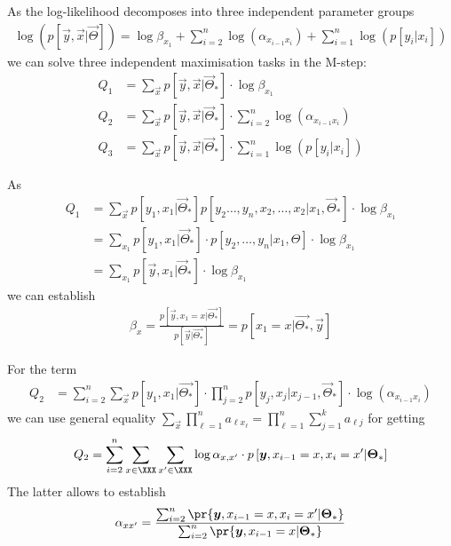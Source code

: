 \documentclass[landscape,footrule]{foils}
\newcommand{\pd}[1]{p\left[#1\right]}
\begin{document}
\enlargethispage{1cm}
As the log-likelihood decomposes into three independent parameter groups 
\begin{align*}
\log\left(\pd{\vec{y},\vec{x}|\vec{\Theta}}\right)=\log \beta_{x_1}+\sum_{i=2}^n\log(\alpha_{x_{i-1}x_i})+\sum_{i=1}^n\log(\pd{y_i|x_i})
\end{align*}
we can solve three independent maximisation tasks in the M-step:
\begin{align*}
Q_1&=\sum_{\vec{x}}\pd{\vec{y},\vec{x}|\vec{\Theta}_*}\cdot \log \beta_{x_1}\\
Q_2&=\sum_{\vec{x}}\pd{\vec{y},\vec{x}|\vec{\Theta}_*}\cdot \sum_{i=2}^n\log(\alpha_{x_{i-1}x_i})\\
Q_3&=\sum_{\vec{x}}\pd{\vec{y},\vec{x}|\vec{\Theta}_*}\cdot \sum_{i=1}^n\log(\pd{y_i|x_i})
\end{align*} 

As
\begin{align*}
Q_1&=\sum_{\vec{x}}\pd{y_1,x_1|\vec{\Theta}_*}\pd{y_2\ldots,y_n,x_2,\ldots,x_2|x_1,\vec{\Theta}_*}\cdot \log \beta_{x_1}\\
&=\sum_{x_1}\pd{y_1,x_1|\vec{\Theta}_*}\cdot \pd{y_2,\ldots,y_n|x_1,\Theta} \cdot \log \beta_{x_1}\\
&=\sum_{x_1}\pd{\vec{y},x_1|\vec{\Theta}_*} \cdot \log \beta_{x_1}
\end{align*}
we can establish
\begin{align*}
\beta_x=\frac{\pd{\vec{y},x_1=x|\vec{\Theta_*}}}{\pd{\vec{y}|\vec{\Theta_*}}}=\pd{x_1=x|\vec{\Theta_*},\vec{y}}
\end{align*}

For the term 
\begin{align*}
Q_2&=\sum_{i=2}^n\sum_{\vec{x}}\pd{y_1,x_1|\vec{\Theta_*}}\cdot\prod_{j=2}^n\pd{y_j,x_j|x_{j-1},\vec{\Theta}_*}\cdot \log(\alpha_{x_{i-1}x_i})
\end{align*}
we can use general equality
$\sum_{\vec{x}}\prod_{\ell=1}^n 
a_{\ell x_\ell}=\prod_{\ell=1}^n\sum_{j=1}^k a_{\ell j}$
for getting
\begin{align*}
Q_2=\sum_{i=2}^n\sum_{x\in\XXX}\sum_{x'\in\XXX}\log\alpha_{x,x'}\cdot\pd{\vec{y}, x_{i-1}=x,x_i=x'|\vec{\Theta}_*}
\end{align*}
The latter allows to establish
\begin{align*}
\alpha_{xx'}=\frac{\sum_{i=2}^n\pr{\vec{y}, x_{i-1}=x,x_i=x'|\vec{\Theta}_*}}{\sum_{i=2}^n\pr{\vec{y}, x_{i-1}=x|\vec{\Theta}_*}}
\end{align*}
\end{document}
